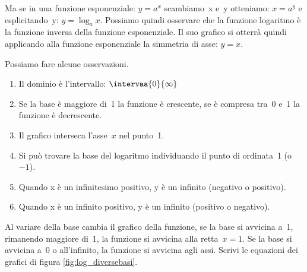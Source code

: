Ma se in una funzione esponenziale: \(y=a^x\) scambiamo~x e~y 
otteniamo: \(x=a^y\) e esplicitando~y: \(y=\log_a x\). Possiamo quindi 
osservare che la funzione logaritmo è la funzione inversa della funzione 
esponenziale. Il suo grafico si otterrà quindi applicando alla funzione 
esponenziale la simmetria di asse: \(y=x\).

\noindent
\begin{minipage}[]{.48\textwidth}
\begin{center}
\begin{inaccessibleblock}[Grafico di una funzione esponenziale e 
il suo simmetrico rispetto a y=x]
  \graficologaritmica
\end{inaccessibleblock}
\end{center}
\end{minipage} \hspace{.04\textwidth}
\begin{minipage}[]{.48\textwidth}
Possiamo fare alcune osservazioni.
\begin{enumerate}
 \item Il dominio è l'intervallo: \(\intervaa{0}{\infty}\)
 \item Se la base è maggiore di~1 la funzione è crescente, 
 se è compresa tra~0 e~1 la funzione è decrescente.
 \item Il grafico interseca l'asse~\(x\) nel punto~1.
 \item Si può trovare la base del logaritmo individuando il punto di 
 ordinata~1 (o~\(-1\)).
 \item Quando x è un infinitesimo positivo, y è un infinito (negativo o 
positivo).
 \item Quando x è un infinito positivo, y è un infinito (positivo o negativo).
\end{enumerate}

\end{minipage} 
\vspace{12pt}

Al variare della base cambia il grafico della funzione, 
se la base si avvicina a~1, rimanendo maggiore di~1, la funzione si avvicina 
alla retta~\(x=1\). 
Se la base si avvicina a~0 o all'infinito, la funzione si avvicina agli assi.
Scrivi le equazioni dei grafici di figura \ref{fig:log_diversebasi}.

